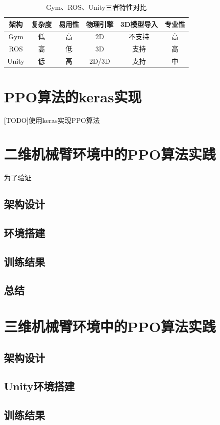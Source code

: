 \documentclass[bachelor]{thesis-uestc}
\begin{document}
	\begin{table}[h]
		\caption{Gym、ROS、Unity三者特性对比}
		\label{compare}
		\begin{tabular}{|c|c|c|c|c|c|}
			\hline
			架构 & 复杂度 & 易用性 & 物理引擎 & 3D模型导入 & 专业性 \\
			\hline
			Gym & 低 & 高 & 2D & 不支持 & 高 \\
			\hline
			ROS & 高 & 低 & 3D & 支持 & 高 \\
			\hline
			Unity & 低 & 高 & 2D/3D & 支持 & 中 \\ 
			\hline
		\end{tabular}
	\end{table}

	\section{PPO算法的keras实现}
	[TODO]使用keras实现PPO算法
	
	\section{二维机械臂环境中的PPO算法实践}
	为了验证
	\subsection{架构设计}
	\subsection{环境搭建}
	\subsection{训练结果}
	\subsection{总结}
	
	\section{三维机械臂环境中的PPO算法实践}
	\subsection{架构设计}
	\subsection{Unity环境搭建}
	\subsection{训练结果}
\end{document}
